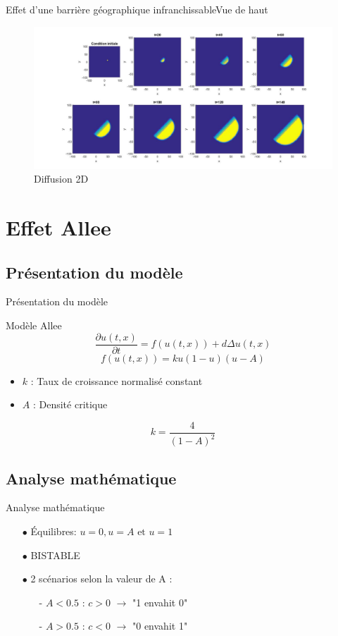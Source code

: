 \documentclass[10pt]{beamer}
\begin{document}
\begin{frame}{Effet d'une barrière géographique infranchissable}{Vue de haut}
\begin{figure}[H]
	\centering
	\includegraphics[width=0.9\linewidth]{SimulationKPP/Enviro/PolenordVueHaut}
	\caption{Diffusion 2D}
\end{figure}
\end{frame}

\section{Effet Allee}
\subsection{Présentation du modèle}
\begin{frame}{Présentation du modèle}{}
\begin{block}{Modèle Allee}
	$$\frac{\partial u(t,x)}{\partial t}=f(u(t,x))+d\Delta u(t,x)$$
	$$f(u(t,x))=ku(1-u)(u-A)$$
\end{block}
\begin{itemize}
    \item $k$ : Taux de croissance normalisé constant 
    \item $A$ : Densité critique
\end{itemize}
$$k=\frac{4}{(1-A)^2}$$
\end{frame}

\subsection{Analyse mathématique}
\begin{frame}{Analyse mathématique}{}
\begin{itemize}
	\item[$\bullet$] Équilibres: $u=0, u=A \text{ et } u=1$
	\item[$\bullet$] BISTABLE
	\item[$\bullet$] 2 scénarios selon la valeur de A :
	\begin{itemize}
		\item[-] $A<0.5$ : $c>0$ $\rightarrow$ "1 envahit 0"
		\item[-] $A>0.5$ : $c<0$ $\rightarrow$ "0 envahit 1"
	\end{itemize}
\end{itemize}
\end{frame}
\end{document}
